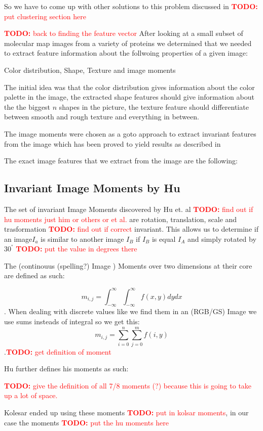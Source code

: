 \documentclass[journal]{vgtc}       %
\newcommand{\todo}[1]{\textcolor{red}{\textbf{TODO:} #1}}
\begin{document}
So we have to come up with other solutions to this problem discussed in \todo{put clustering section here}


\todo{back to finding the feature vector}
After looking at a small subset of molecular map images from a variety of proteins we determined that we needed to extract feature information about the follwoing properties of a given image: 

Color distribution, Shape, Texture and image moments 

The initial idea was that the color distribution gives information about the color palette in the image, the extracted shape features should give information about the the biggest \( n \) shapes in the picture, the texture feature should differentiate between smooth and rough texture and everything in between.

The image moments were chosen as a goto approach to extract invariant features from the image which has been proved to yield results as described in \cite{kolesar}

The exact image features that we extract from the image are the following:

\subsection{Invariant Image Moments by Hu}

The set of invariant Image Moments discovered by Hu et. al \todo{find out if hu moments just him or others or et al.} are rotation, translation, scale and trasformation \todo{find out if correct} invariant. This allows us to determine if an image$I_a$ is similar to another image $I_B$ if $I_B$ is equal $I_A$ and simply rotated by $30^°$ \todo{put the value in degrees there}

The (continouus (spelling?)  Image ) Moments  over two dimensions at their core are defined as such:

\[m_{i,j} = \int^\infty_{- \infty}\int^\infty_{- \infty} f(x,y) dy dx \]. When dealing with discrete values like we find them in an (RGB/GS) Image we use sums insteads of integral so we get this:
\[m_{i,j} = \sum^n_{i=0}\sum^m_{j=0} f(i,y) \].\todo{get definition of moment}

Hu further defines his moments as such:

\todo{give the definition of all 7/8 moments (?) because this is going to take up a lot of space. }

Kolesar ended up using these moments \todo{put in kolsar moments}, in our case the moments \todo{put the hu moments here}
\end{document}
